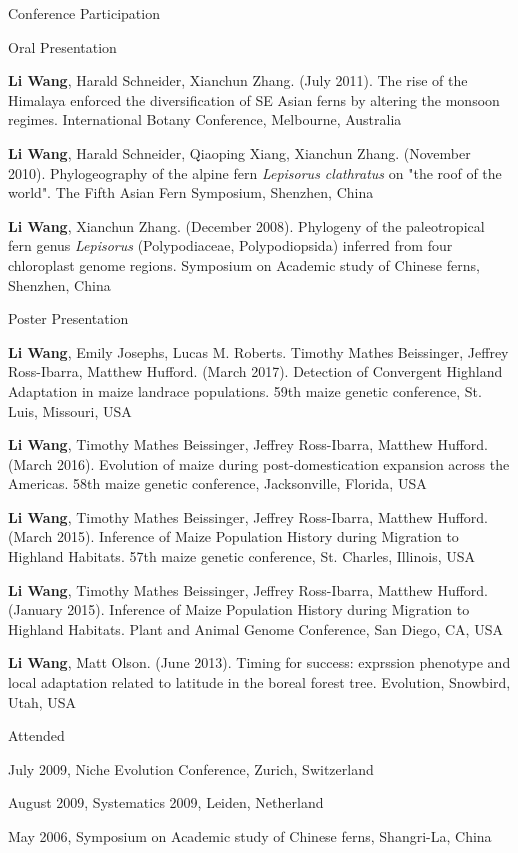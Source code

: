 \documentclass{resume} %
\begin{document}
\begin{rSection}{Conference Participation}{}{}
\begin{rSubsection}{Oral Presentation}{}{}{}
\item \textbf{Li Wang}, Harald Schneider, Xianchun Zhang. (July 2011). The rise of the Himalaya enforced the diversification of SE Asian ferns by altering the monsoon regimes. International Botany Conference, Melbourne, Australia
\item \textbf{Li Wang}, Harald Schneider, Qiaoping Xiang, Xianchun Zhang. (November 2010). Phylogeography of the alpine fern \emph{Lepisorus clathratus} on "the roof of the world". The Fifth Asian Fern Symposium, Shenzhen, China
\item \textbf{Li Wang}, Xianchun Zhang. (December 2008). Phylogeny of the paleotropical fern genus \emph{Lepisorus} (Polypodiaceae, Polypodiopsida) inferred from four chloroplast genome regions. Symposium on Academic study of Chinese ferns, Shenzhen, China

\end{rSubsection}

\begin{rSubsection}{Poster Presentation}{}{}{}
\item \textbf{Li Wang}, Emily Josephs, Lucas M. Roberts. Timothy Mathes Beissinger, Jeffrey Ross-Ibarra, Matthew Hufford. (March 2017). Detection of Convergent Highland Adaptation in maize landrace populations. 59th maize genetic conference, St. Luis, Missouri, USA
\item \textbf{Li Wang}, Timothy Mathes Beissinger, Jeffrey Ross-Ibarra, Matthew Hufford. (March 2016). Evolution of maize during post-domestication expansion across the Americas. 58th maize genetic conference, Jacksonville, Florida, USA
\item \textbf{Li Wang}, Timothy Mathes Beissinger, Jeffrey Ross-Ibarra, Matthew Hufford. (March 2015). Inference of Maize Population History during Migration to Highland Habitats. 57th maize genetic conference, St. Charles, Illinois, USA
\item \textbf{Li Wang}, Timothy Mathes Beissinger, Jeffrey Ross-Ibarra, Matthew Hufford. (January 2015). Inference of Maize Population History during Migration to Highland Habitats. Plant and Animal Genome Conference, San Diego, CA, USA
\item \textbf{Li Wang}, Matt Olson. (June 2013). Timing for success: exprssion phenotype and local adaptation related to latitude in the boreal forest tree. Evolution, Snowbird, Utah, USA
\end{rSubsection}

\begin{rSubsection}{Attended}{}{}{}
\item July 2009, Niche Evolution Conference, Zurich, Switzerland
\item August 2009, Systematics 2009, Leiden, Netherland 
\item May 2006, Symposium on Academic study of Chinese ferns, Shangri-La, China
\end{rSubsection}

\end{rSection}
\end{document}
